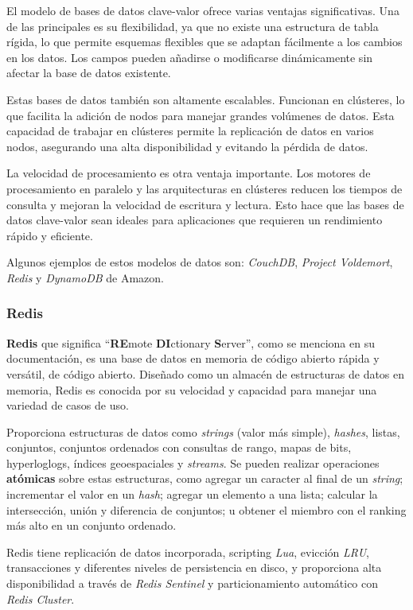 \documentclass[pdflatex,sn-mathphys-num]{sn-jnl}
\theoremstyle{thmstyleone}%
\theoremstyle{thmstyletwo}%
\theoremstyle{thmstylethree}%
\begin{document}
El modelo de bases de datos clave-valor ofrece varias ventajas significativas. Una de las principales es su flexibilidad, ya que no existe una estructura de tabla rígida, lo que permite esquemas flexibles que se adaptan fácilmente a los cambios en los datos. Los campos pueden añadirse o modificarse dinámicamente sin afectar la base de datos existente.

Estas bases de datos también son altamente escalables. Funcionan en clústeres, lo que facilita la adición de nodos para manejar grandes volúmenes de datos. Esta capacidad de trabajar en clústeres permite la replicación de datos en varios nodos, asegurando una alta disponibilidad y evitando la pérdida de datos.

La velocidad de procesamiento es otra ventaja importante. Los motores de procesamiento en paralelo y las arquitecturas en clústeres reducen los tiempos de consulta y mejoran la velocidad de escritura y lectura. Esto hace que las bases de datos clave-valor sean ideales para aplicaciones que requieren un rendimiento rápido y eficiente.

Algunos ejemplos de estos modelos de datos son: \textit{CouchDB}, \textit{Project Voldemort}, \textit{Redis} y \textit{DynamoDB} de Amazon.

\subsubsection{Redis}\label{sec411}

\textbf{Redis} que significa ``\textbf{RE}mote \textbf{DI}ctionary \textbf{S}erver'', como se menciona en su documentación\cite{redis}, es una base de datos en memoria de código abierto rápida y versátil, de código abierto. Diseñado como un almacén de estructuras de datos en memoria, Redis es conocida por su velocidad y capacidad para manejar una variedad de casos de uso.

Proporciona estructuras de datos como \textit{strings} (valor más simple), \textit{hashes}, listas, conjuntos, conjuntos ordenados con consultas de rango, mapas de bits, hyperloglogs, índices geoespaciales y \textit{streams}. Se pueden realizar operaciones \textbf{atómicas} sobre estas estructuras, como agregar un caracter al final de un \textit{string}; incrementar el valor en un \textit{hash}; agregar un elemento a una lista; calcular la intersección, unión y diferencia de conjuntos; u obtener el miembro con el ranking más alto en un conjunto ordenado.

Redis tiene replicación de datos incorporada, scripting \textit{Lua}, evicción \textit{LRU}, transacciones y diferentes niveles de persistencia en disco, y proporciona alta disponibilidad a través de \textit{Redis Sentinel} y particionamiento automático con \textit{Redis Cluster}.
\end{document}
